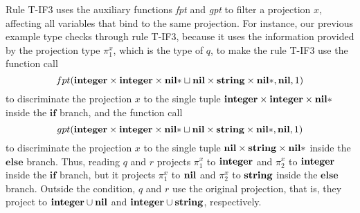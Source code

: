 Rule \textsc{T-IF3} uses the auxiliary functions \emph{fpt} and \emph{gpt}
to filter a projection $x$, affecting all variables that bind to the same projection.
For instance, our previous example type checks through rule \textsc{T-IF3},
because it uses the information provided by the projection type $\pi_{1}^{x}$,
which is the type of $q$, to make the rule \textsc{T-IF3} use the function call
\[
fpt(\mathbf{integer} \times \mathbf{integer} \times \mathbf{nil}{*} \sqcup \mathbf{nil} \times \mathbf{string} \times \mathbf{nil}{*}, \mathbf{nil}, 1)
\]
to discriminate the projection $x$ to the single tuple
$\mathbf{integer} \times \mathbf{integer} \times \mathbf{nil}{*}$ inside the $\mathbf{if}$ branch,
and the function call
\[
gpt(\mathbf{integer} \times \mathbf{integer} \times \mathbf{nil}{*} \sqcup \mathbf{nil} \times \mathbf{string} \times \mathbf{nil}{*}, \mathbf{nil}, 1)
\]
to discriminate the projection $x$ to the single tuple
$\mathbf{nil} \times \mathbf{string} \times \mathbf{nil}{*}$ inside the $\mathbf{else}$ branch.
Thus, reading $q$ and $r$ projects $\pi_{1}^{x}$ to $\mathbf{integer}$ and
$\pi_{2}^{x}$ to $\mathbf{integer}$ inside the $\mathbf{if}$ branch,
but it projects $\pi_{1}^{x}$ to $\mathbf{nil}$ and $\pi_{2}^{x}$ to $\mathbf{string}$
inside the $\mathbf{else}$ branch.
Outside the condition, $q$ and $r$ use the original projection, that is,
they project to $\mathbf{integer} \cup \mathbf{nil}$ and $\mathbf{integer} \cup \mathbf{string}$, respectively.

